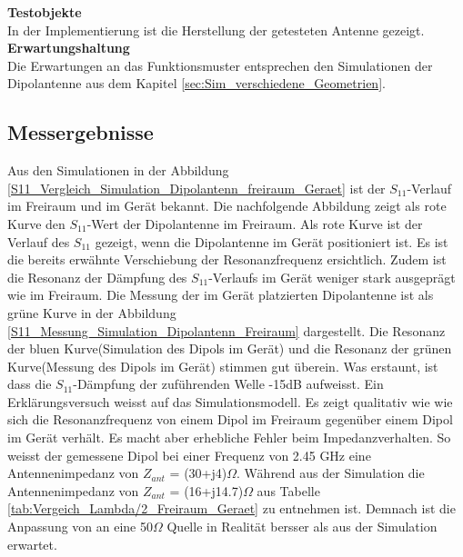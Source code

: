 \textbf{Testobjekte}\\
In der Implementierung ist die Herstellung der getesteten Antenne gezeigt.\\ 
\textbf{Erwartungshaltung}\\
Die Erwartungen an das Funktionsmuster entsprechen den Simulationen der Dipolantenne aus dem Kapitel \ref{sec:Sim_verschiedene_Geometrien}.\\

\subsection{Messergebnisse}
Aus den Simulationen in der Abbildung \ref{S11_Vergleich_Simulation_Dipolantenn_freiraum_Geraet} ist der $S_{11}$-Verlauf im Freiraum und im Gerät bekannt. Die nachfolgende Abbildung zeigt als rote Kurve den $S_{11}$-Wert der Dipolantenne im Freiraum. Als rote Kurve ist der Verlauf des $S_{11}$ gezeigt, wenn die Dipolantenne im Gerät positioniert ist. Es ist die bereits erwähnte Verschiebung der Resonanzfrequenz ersichtlich. Zudem ist die Resonanz der Dämpfung des $S_{11}$-Verlaufs im Gerät weniger stark ausgeprägt wie im Freiraum. Die Messung der im Gerät platzierten Dipolantenne ist als grüne Kurve in der Abbildung \ref{S11_Messung_Simulation_Dipolantenn_Freiraum} dargestellt. Die Resonanz der bluen Kurve(Simulation des Dipols im Gerät) und die Resonanz der grünen Kurve(Messung des Dipols im Gerät) stimmen gut überein. Was erstaunt, ist dass die $S_{11}$-Dämpfung der zuführenden Welle -15dB aufweisst. Ein Erklärungsversuch weisst auf das Simulationsmodell. Es zeigt qualitativ wie wie sich die Resonanzfrequenz von einem Dipol im Freiraum gegenüber einem Dipol im Gerät verhält. Es macht aber erhebliche Fehler beim Impedanzverhalten. So weisst der gemessene Dipol bei einer Frequenz von 2.45 GHz eine Antennenimpedanz von $Z_{ant}$ = (30+j4)$\Omega$. Während aus der Simulation die Antennenimpedanz von $Z_{ant}$ = (16+j14.7)$\Omega$ aus Tabelle \ref{tab:Vergeich_Lambda/2_Freiraum_Geraet} zu entnehmen ist. Demnach ist die Anpassung von an eine 50$\Omega$ Quelle in Realität bersser als aus der Simulation erwartet.


%	

